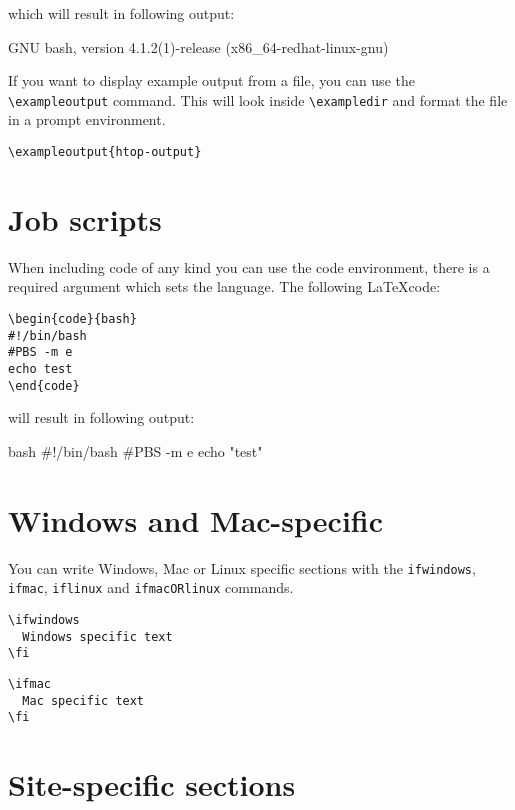 \documentclass[11pt,a4paper]{article}
\begin{document}
which will result in following output:

\begin{prompt}
GNU bash, version 4.1.2(1)-release (x86_64-redhat-linux-gnu)
\end{prompt}

If you want to display example output from a file, you can use the
\lstinline|\exampleoutput| command. This will look inside \lstinline|\exampledir| and
format the file in a prompt environment.

\begin{verbatim}
\exampleoutput{htop-output}
\end{verbatim}

\section{Job scripts}
\label{sec:job-scripts}

When including code of any kind you can use the code environment, there is a
required argument which sets the language. The following \LaTeX code:

\begin{verbatim}
\begin{code}{bash}
#!/bin/bash
#PBS -m e
echo test
\end{code}
\end{verbatim}

will result in following output:

\begin{code}{bash}
#!/bin/bash
#PBS -m e
echo "test"
\end{code}

\section{Windows and Mac-specific}
\label{sec:windows-and-mac-specific}

You can write Windows, Mac or Linux specific sections with the \texttt{ifwindows}, \texttt{ifmac}, \texttt{iflinux} and
\texttt{ifmacORlinux} commands.

\begin{verbatim}
\ifwindows
  Windows specific text
\fi
\end{verbatim}

\begin{verbatim}
\ifmac
  Mac specific text
\fi
\end{verbatim}


\section{Site-specific sections}
\label{sec:site-specific-sections}
\end{document}
